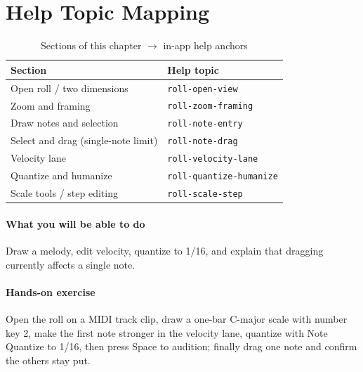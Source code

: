 \section{Help Topic Mapping}

\begin{table}[htbp]
\centering
\caption{Sections of this chapter $\to$ in-app help anchors}
\label{tab:ch04-help}
\begin{tabular}{ll}
\hline
Section & Help topic \\
\hline
Open roll / two dimensions & \texttt{roll-open-view} \\
Zoom and framing & \texttt{roll-zoom-framing} \\
Draw notes and selection & \texttt{roll-note-entry} \\
Select and drag (single-note limit) & \texttt{roll-note-drag} \\
Velocity lane & \texttt{roll-velocity-lane} \\
Quantize and humanize & \texttt{roll-quantize-humanize} \\
Scale tools / step editing & \texttt{roll-scale-step} \\
\hline
\end{tabular}
\end{table}

\paragraph{What you will be able to do} Draw a melody, edit velocity, quantize to 1/16, and explain that dragging currently affects a single note.

\paragraph{Hands-on exercise} Open the roll on a MIDI track clip, draw a one-bar C-major scale with number key 2, make the first note stronger in the velocity lane, quantize with Note Quantize to 1/16, then press Space to audition; finally drag one note and confirm the others stay put.
